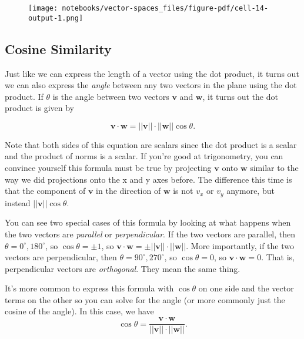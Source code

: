 \documentclass[
  letterpaper,
  DIV=11,
  numbers=noendperiod]{scrreprt}
\begin{document}
\begin{figure}[H]

{\centering \texttt{[image: notebooks/vector-spaces\_files/figure-pdf/cell-14-output-1.png]}

}

\end{figure}

\hypertarget{cosine-similarity}{%
\subsection{Cosine Similarity}\label{cosine-similarity}}

Just like we can express the length of a vector using the dot product,
it turns out we can also express the \emph{angle} between any two
vectors in the plane using the dot product. If \(\theta\) is the angle
between two vectors \(\mathbf{v}\) and \(\mathbf{w}\), it turns out the
dot product is given by

\[\mathbf{v} \cdot \mathbf{w} = ||\mathbf{v}|| \cdot ||\mathbf{w}|| \cos \theta.\]

Note that both sides of this equation are scalars since the dot product
is a scalar and the product of norms is a scalar. If you're good at
trigonometry, you can convince yourself this formula must be true by
projecting \(\mathbf{v}\) onto \(\mathbf{w}\) similar to the way we did
projections onto the x and y axes before. The difference this time is
that the component of \(\mathbf{v}\) in the direction of \(\mathbf{w}\)
is not \(v_x\) or \(v_y\) anymore, but instead
\(||\mathbf{v}|| \cos \theta\).

You can see two special cases of this formula by looking at what happens
when the two vectors are \emph{parallel} or \emph{perpendicular}. If the
two vectors are parallel, then \(\theta = 0^\circ, 180^\circ\), so
\(\cos \theta = \pm 1\), so
\(\mathbf{v} \cdot \mathbf{w} = \pm ||\mathbf{v}|| \cdot ||\mathbf{w}||\).
More importantly, if the two vectors are perpendicular, then
\(\theta = 90^\circ, 270^\circ\), so \(\cos \theta = 0\), so
\(\mathbf{v} \cdot \mathbf{w} = 0\). That is, perpendicular vectors are
\emph{orthogonal}. They mean the same thing.

It's more common to express this formula with \(\cos \theta\) on one
side and the vector terms on the other so you can solve for the angle
(or more commonly just the cosine of the angle). In this case, we have
\[\cos \theta = \frac{\mathbf{v} \cdot \mathbf{w}}{||\mathbf{v}|| \cdot ||\mathbf{w}||}.\]
\end{document}
